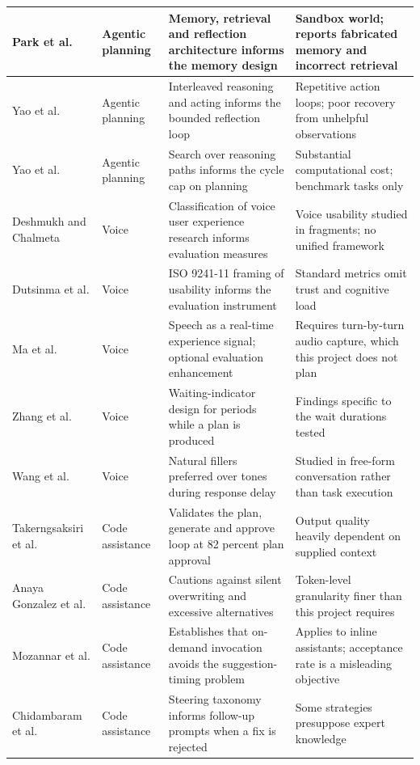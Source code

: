 \documentclass{FastFyp}
\begin{document}
{\begin{longtable}{|p{2.6cm}|p{2.0cm}|p{3.6cm}|p{4.6cm}|}
\hline
Park et al. \cite{ref:park2023} & Agentic planning & Memory, retrieval and reflection architecture informs the memory design & Sandbox world; reports fabricated memory and incorrect retrieval \\
\hline
Yao et al. \cite{ref:yao2023react} & Agentic planning & Interleaved reasoning and acting informs the bounded reflection loop & Repetitive action loops; poor recovery from unhelpful observations \\
\hline
Yao et al. \cite{ref:yao2023tot} & Agentic planning & Search over reasoning paths informs the cycle cap on planning & Substantial computational cost; benchmark tasks only \\
\hline
Deshmukh and Chalmeta \cite{ref:deshmukh2024} & Voice & Classification of voice user experience research informs evaluation measures & Voice usability studied in fragments; no unified framework \\
\hline
Dutsinma et al. \cite{ref:dutsinma2022} & Voice & ISO 9241-11 framing of usability informs the evaluation instrument & Standard metrics omit trust and cognitive load \\
\hline
Ma et al. \cite{ref:ma2026} & Voice & Speech as a real-time experience signal; optional evaluation enhancement & Requires turn-by-turn audio capture, which this project does not plan \\
\hline
Zhang et al. \cite{ref:zhang2025} & Voice & Waiting-indicator design for periods while a plan is produced & Findings specific to the wait durations tested \\
\hline
Wang et al. \cite{ref:wang2025} & Voice & Natural fillers preferred over tones during response delay & Studied in free-form conversation rather than task execution \\
\hline
Takerngsaksiri et al. \cite{ref:takerngsaksiri2025} & Code assistance & Validates the plan, generate and approve loop at 82 percent plan approval & Output quality heavily dependent on supplied context \\
\hline
Anaya Gonzalez et al. \cite{ref:gonzalez2025} & Code assistance & Cautions against silent overwriting and excessive alternatives & Token-level granularity finer than this project requires \\
\hline
Mozannar et al. \cite{ref:mozannar2024} & Code assistance & Establishes that on-demand invocation avoids the suggestion-timing problem & Applies to inline assistants; acceptance rate is a misleading objective \\
\hline
Chidambaram et al. \cite{ref:chidambaram2024} & Code assistance & Steering taxonomy informs follow-up prompts when a fix is rejected & Some strategies presuppose expert knowledge \\

\end{longtable}}
\end{document}
